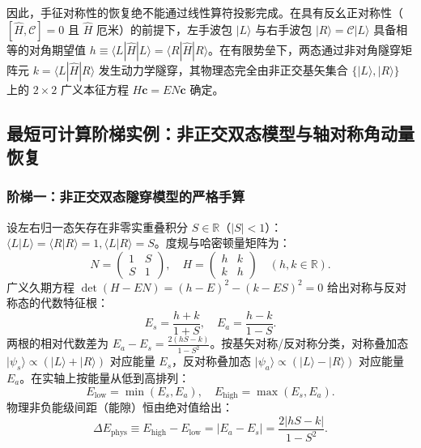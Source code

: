 因此，手征对称性的恢复绝不能通过线性算符投影完成。在具有反幺正对称性（$[\hat{H}, \mathcal{C}] = 0$ 且 $\hat{H}$ 厄米）的前提下，左手波包 $|L\rangle$ 与右手波包 $|R\rangle = \mathcal{C}|L\rangle$ 具备相等的对角期望值 $h \equiv \langle L|\hat{H}|L\rangle = \langle R|\hat{H}|R\rangle$。在有限势垒下，两态通过非对角隧穿矩阵元 $k = \langle L|\hat{H}|R\rangle$ 发生动力学隧穿，其物理态完全由非正交基矢集合 $\{|L\rangle, |R\rangle\}$ 上的 $2 \times 2$ 广义本征方程 $H \mathbf{c} = E N \mathbf{c}$ 确定。

\subsection{最短可计算阶梯实例：非正交双态模型与轴对称角动量恢复}\label{sec:2-5-5}

\subsubsection{阶梯一：非正交双态隧穿模型的严格手算}\label{sec:2-5-5-1}

设左右归一态矢存在非零实重叠积分 $S \in \mathbb{R}$（$|S| < 1$）：$\langle L|L\rangle = \langle R|R\rangle = 1, \langle L|R\rangle = S$。度规与哈密顿量矩阵为：
\begin{equation}\label{eq:2-5-ladder1-matrices}
N = \begin{pmatrix} 1 & S \\ S & 1 \end{pmatrix}, \quad H = \begin{pmatrix} h & k \\ k & h \end{pmatrix} \quad (h, k \in \mathbb{R}).
\end{equation}
广义久期方程 $\det(H - E N) = (h - E)^2 - (k - E S)^2 = 0$ 给出对称与反对称态的代数特征根：
\begin{equation}\label{eq:2-5-ladder1-energies}
E_s = \frac{h + k}{1 + S}, \quad E_a = \frac{h - k}{1 - S}.
\end{equation}
两根的相对代数差为 $E_a - E_s = \frac{2(h S - k)}{1 - S^2}$。按基矢对称/反对称分类，对称叠加态 $|\psi_s\rangle \propto (|L\rangle + |R\rangle)$ 对应能量 $E_s$，反对称叠加态 $|\psi_a\rangle \propto (|L\rangle - |R\rangle)$ 对应能量 $E_a$。在实轴上按能量从低到高排列：
\begin{equation}\label{eq:2-5-ladder1-ordered-energies}
E_{\text{low}} = \min(E_s, E_a), \quad E_{\text{high}} = \max(E_s, E_a).
\end{equation}
物理非负能级间距（能隙）恒由绝对值给出：
\begin{equation}\label{eq:2-5-ladder1-gap}
\Delta E_{\text{phys}} \equiv E_{\text{high}} - E_{\text{low}} = |E_a - E_s| = \frac{2|h S - k|}{1 - S^2}.
\end{equation}

